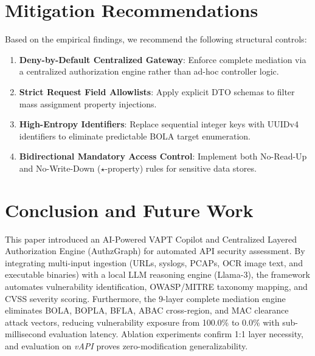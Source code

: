 \documentclass[journal]{IEEEtran}
\begin{document}
\begin{table}[!t]
\centering
\caption{Cross-Application Generalizability Validation Against Target \textit{vAPI}}
\label{tab:vapi_results}
\end{table}


\section{Mitigation Recommendations}

Based on the empirical findings, we recommend the following structural controls:
\begin{enumerate}
    \item \textbf{Deny-by-Default Centralized Gateway}: Enforce complete mediation via a centralized authorization engine rather than ad-hoc controller logic.
    \item \textbf{Strict Request Field Allowlists}: Apply explicit DTO schemas to filter mass assignment property injections.
    \item \textbf{High-Entropy Identifiers}: Replace sequential integer keys with UUIDv4 identifiers to eliminate predictable BOLA target enumeration.
    \item \textbf{Bidirectional Mandatory Access Control}: Implement both No-Read-Up and No-Write-Down ($\star$-property) rules for sensitive data stores.
\end{enumerate}


\section{Conclusion and Future Work}

This paper introduced an AI-Powered VAPT Copilot and Centralized Layered Authorization Engine (AuthzGraph) for automated API security assessment. By integrating multi-input ingestion (URLs, syslogs, PCAPs, OCR image text, and executable binaries) with a local LLM reasoning engine (Llama-3), the framework automates vulnerability identification, OWASP/MITRE taxonomy mapping, and CVSS severity scoring. Furthermore, the 9-layer complete mediation engine eliminates BOLA, BOPLA, BFLA, ABAC cross-region, and MAC clearance attack vectors, reducing vulnerability exposure from 100.0\% to 0.0\% with sub-millisecond evaluation latency. Ablation experiments confirm 1:1 layer necessity, and evaluation on \textit{vAPI} proves zero-modification generalizability.
\end{document}
